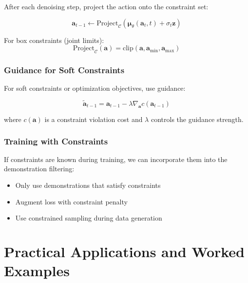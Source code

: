 After each denoising step, project the action onto the constraint set:

\begin{equation}
\mathbf{a}_{t-1} \gets \text{Project}_{\mathcal{C}}(\boldsymbol{\mu}_\theta(\mathbf{a}_t, t) + \sigma_t \mathbf{z})
\label{eq:constraint_projection}
\end{equation}

For box constraints (joint limits):
\begin{equation}
\text{Project}_{\mathcal{C}}(\mathbf{a}) = \text{clip}(\mathbf{a}, \mathbf{a}_{\min}, \mathbf{a}_{\max})
\label{eq:box_projection}
\end{equation}

\subsubsection{Guidance for Soft Constraints}

For soft constraints or optimization objectives, use guidance:

\begin{equation}
\tilde{\mathbf{a}}_{t-1} = \mathbf{a}_{t-1} - \lambda \nabla_{\mathbf{a}} c(\mathbf{a}_{t-1})
\label{eq:soft_constraint_guidance}
\end{equation}

where $c(\mathbf{a})$ is a constraint violation cost and $\lambda$ controls the guidance strength.

\subsubsection{Training with Constraints}

If constraints are known during training, we can incorporate them into the demonstration filtering:
\begin{itemize}
    \item Only use demonstrations that satisfy constraints
    \item Augment loss with constraint penalty
    \item Use constrained sampling during data generation
\end{itemize}

\section{Practical Applications and Worked Examples}
\label{sec:practical_applications}

